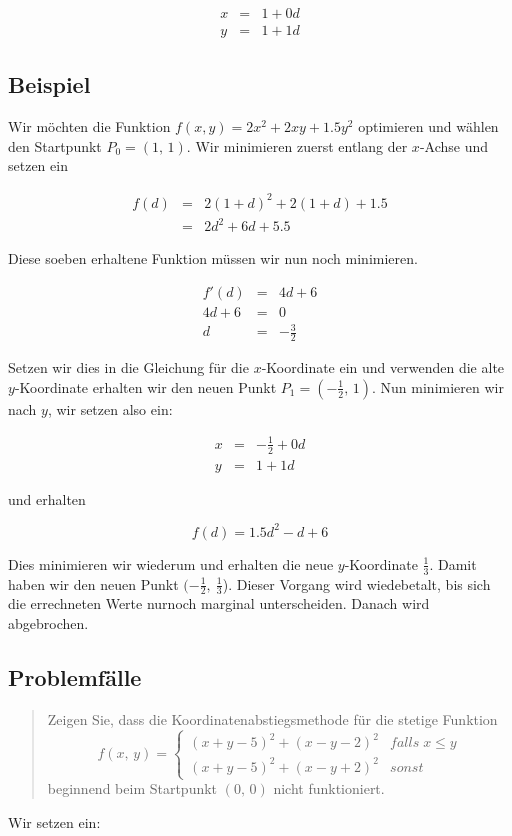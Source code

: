 \documentclass[naustrian]{article}
\begin{document}
{\begin{eqnarray*}
    x & = & 1+0d\\
    y & = & 1+1d
\end{eqnarray*}



\subsection{Beispiel}

Wir möchten die Funktion $f(x,y)=2x^{2}+2xy+1.5y^{2}$ optimieren
und wählen den Startpunkt $P_{0}=(1,\,1)$. Wir minimieren zuerst
entlang der $x$-Achse und setzen ein

\begin{eqnarray*}
    f(d) & = & 2(1+d)^{2}+2(1+d)+1.5\\
    & = & 2d^{2}+6d+5.5
\end{eqnarray*}

Diese soeben erhaltene Funktion müssen wir nun noch minimieren.

\begin{eqnarray*}
    f'(d) & = & 4d+6\\
    4d+6 & = & 0\\
    d & = & - \frac{3}{2}
\end{eqnarray*}


Setzen wir dies in die Gleichung für die $x$-Koordinate ein und verwenden
die alte $y$-Koordinate erhalten wir den neuen Punkt $P_{1}=(-\frac{1}{2},\,1)$.
Nun minimieren wir nach $y$, wir setzen also ein:

\begin{eqnarray*}
    x & = & -\frac{1}{2}+0d\\
    y & = & 1+1d
\end{eqnarray*}

und erhalten

\[
    f(d)=1.5d^{2}-d+6
\]

Dies minimieren wir wiederum und erhalten die neue $y$-Koordinate
$\frac{1}{3}$. Damit haben wir den neuen Punkt $(-\frac{1}{2},\:\frac{1}{3}$).
Dieser Vorgang wird wiedebetalt, bis sich die errechneten Werte nurnoch
marginal unterscheiden. Danach wird abgebrochen.

\subsection{Problemfälle}
\begin{quotation}
    \noindent Zeigen Sie, dass die Koordinatenabstiegsmethode für die stetige Funktion
    \[
        f(x,\,y)=
        \begin{cases}
            (x+y-5)^{2}+(x-y-2)^{2} & falls\;x\le y\\
            (x+y-5)^{2}+(x-y+2)^{2} & sonst
        \end{cases}
    \]
    beginnend beim Startpunkt $(0,\,0)$ nicht funktioniert.
\end{quotation}
Wir setzen ein:

}
\end{document}
